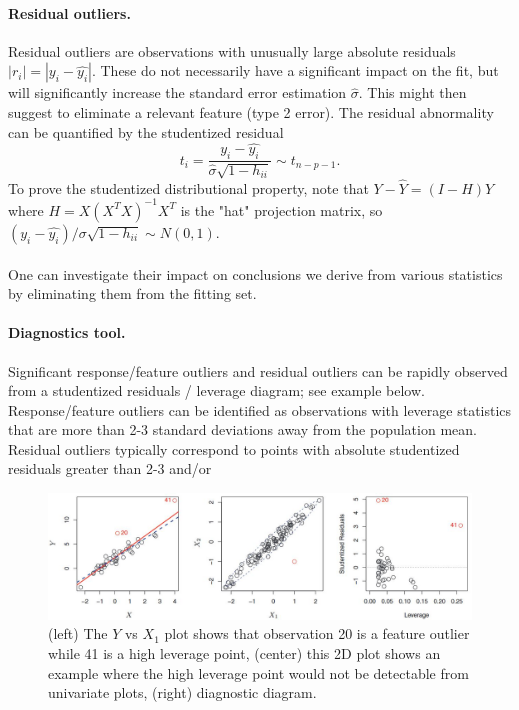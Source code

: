 \documentclass[]{article}
\begin{document}
\paragraph{Residual outliers.} Residual outliers are observations with unusually large absolute residuals $|r_i|=|y_i-\hat{y_i}|$. These do not necessarily have a significant impact on the fit, but will significantly increase the standard error estimation $\hat{\sigma}$. This might then suggest to eliminate a relevant feature (type 2 error). The residual abnormality can be quantified by the studentized residual
\begin{equation}
t_i = \frac{y_i-\hat{y_i}}{\hat{\sigma}\sqrt{1-h_{ii}}}\sim t_{n-p-1}.
\end{equation}
To prove the studentized distributional property, note that $Y-\hat{Y}=(I-H)Y$ where $H=X(X^TX)^{-1}X^T$ is the "hat" projection matrix, so $(y_i-\hat{y_i})/\sigma \sqrt{1-h_{ii}}\sim N(0,1)$. \\ \\
\noindent One can investigate their impact on conclusions we derive from various statistics by eliminating them from the fitting set.

\paragraph{Diagnostics tool.} Significant response/feature outliers and residual outliers can be rapidly observed from a studentized residuals / leverage diagram; see example below. Response/feature outliers can be identified as observations with leverage statistics that are more than 2-3 standard deviations away from the population mean. Residual outliers typically correspond to points with absolute studentized residuals greater than 2-3 and/or 

\begin{figure}[H]
\center \includegraphics[scale=0.45]{outlier_examples.jpg}
\caption{(left) The $Y$ vs $X_1$ plot shows that observation 20 is a feature outlier while 41 is a high leverage point, (center) this 2D plot shows an example where the high leverage point would not be detectable from univariate plots, (right) diagnostic diagram.}
\end{figure}
\end{document}
